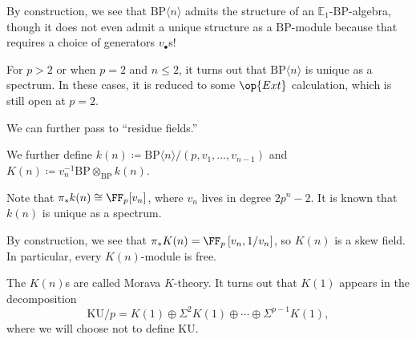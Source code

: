 \documentclass[../notes.tex]{subfiles}
\begin{document}
\begin{remark}
	By construction, we see that $\mathrm{BP}\langle n\rangle$ admits the structure of an $\mathbb E_1$-$\mathrm{BP}$-algebra, though it does not even admit a unique structure as a $\mathrm{BP}$-module because that requires a choice of generators $v_\bullet$s!
\end{remark}
\begin{remark}
	For $p>2$ or when $p=2$ and $n\le2$, it turns out that $\mathrm{BP}\langle n\rangle$ is unique as a spectrum. In these cases, it is reduced to some $\op{Ext}$ calculation, which is still open at $p=2$.
\end{remark}
We can further pass to ``residue fields.''
\begin{definition}
	We further define $k(n)\coloneqq\mathrm{BP}\langle n\rangle/(p,v_1,\ldots,v_{n-1})$ and $K(n)\coloneqq v_n^{-1}\mathrm{BP}\otimes_{\mathrm{BP}}k(n)$.
\end{definition}
\begin{remark}
	Note that $\pi_*k(n)\cong\FF_p[v_n]$, where $v_n$ lives in degree $2p^n-2$. It is known that $k(n)$ is unique as a spectrum.
\end{remark}
\begin{remark}
	By construction, we see that $\pi_*K(n)=\FF_p\left[v_n,1/v_n\right]$, so $K(n)$ is a skew field. In particular, every $K(n)$-module is free.
\end{remark}
\begin{remark}
	The $K(n)$s are called Morava $K$-theory. It turns out that $K(1)$ appears in the decomposition
	\[\mathrm{KU}/p=K(1)\oplus\Sigma^2K(1)\oplus\cdots\oplus\Sigma^{p-1}K(1),\]
	where we will choose not to define $\mathrm{KU}$.
\end{remark}
\end{document}
